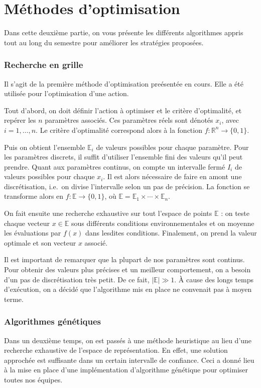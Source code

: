 \documentclass[12pt,a4paper]{article}
\begin{document}
\newpage

\part{M\'ethodes d'optimisation}
Dans cette deuxi\`eme partie, on vous pr\'esente les diff\'erents 
algorithmes appris tout au long du semestre pour am\'eliorer 
les strat\'egies propos\'ees.

\section{Recherche en grille}
Il s'agit de la premi\`ere m\'ethode d'optimisation pre\'esent\'ee en cours. 
Elle a \'et\'e utilis\'ee pour l'optimisation d'une action.

Tout d'abord, on doit d\'efinir l'action \`a optimiser et le crit\`ere 
d'optimalit\'e, et rep\'erer les $n$ param\`etres associ\'es. Ces param\`etres 
r\'eels sont d\'enot\'es $x_i$, avec $i=1,\dotsc,n$. Le crit\`ere 
d'optimalit\'e correspond alors \`a la fonction $f: \mathbb{R}^n \to \{0,1\}$.

Puis on obtient l'ensemble $\mathbb{E}_i$ de valeurs possibles pour chaque 
param\`etre. 
Pour les param\`etres discrets, il suffit d'utiliser l'ensemble fini des valeurs 
qu'il peut prendre. 
Quant aux param\`etres continus, on compte un intervalle ferm\'e $I_i$ de 
valeurs possibles pour chaque $x_i$. Il est alors n\'ecessaire de faire en 
amont une discr\'etisation, i.e.\ on divise l'intervalle selon un pas de 
pr\'ecision. La fonction se transforme alors en $f: \mathbb{E} \to \{0,1\}$, 
o\`u $\mathbb{E} =  \mathbb{E}_1 \times \cdots \times \mathbb{E}_n$.

On fait ensuite une recherche exhaustive sur tout l'espace de 
points $\mathbb{E}$ : on teste chaque vecteur $x \in \mathbb{E}$ sous 
diff\'erents conditions environnementales et on moyenne les \'evaluations par 
$f(x)$ dans lesdites conditions. Finalement, on prend la valeur optimale et son 
vecteur $x$ associ\'e.

Il est important de remarquer que la plupart de nos param\`etres sont continus. 
Pour obtenir des valeurs plus pr\'ecises et un meilleur comportement, on a 
besoin d'un pas de discr\'etisation tr\`es petit. De ce fait, 
$|\mathbb{E}| \gg 1$. \`A cause des longs temps d'ex\'ecution, on a 
d\'ecid\'e que l'algorithme mis en place ne convenait pas \`a moyen terme.

\section{Algorithmes g\'en\'etiques}
Dans un deuxi\`eme temps, on est pass\'es \`a une m\'ethode heuristique au 
lieu d'une recherche exhaustive de l'espace de repr\'esentation. En effet, 
une solution approch\'ee est suffisante dans un certain intervalle de 
confiance. Ceci a donn\'e lieu \`a la mise en place d'une impl\'ementation 
d'algorithme g\'en\'etique pour optimiser toutes nos \'equipes.
\end{document}
